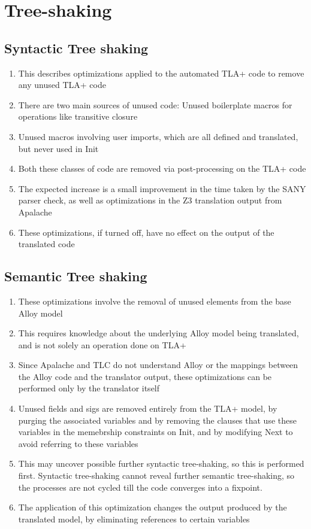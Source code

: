 

\section{Tree-shaking}


\subsection{Syntactic Tree shaking}

\begin{enumerate}
	\item This describes optimizations applied to the automated TLA+ code to remove any unused TLA+ code
	\item There are two main sources of unused code: Unused boilerplate macros for operations like transitive closure
	\item Unused macros involving user imports, which are all defined and translated, but never used in Init
	\item Both these classes of code are removed via post-processing on the TLA+ code
	\item The expected increase is a small improvement in the time taken by the SANY parser check, as well as optimizations in the Z3 translation output from Apalache
	\item These optimizations, if turned off, have no effect on the output of the translated code
\end{enumerate}

\subsection{Semantic Tree shaking}

\begin{enumerate}
	\item These optimizations involve the removal of unused elements from the base Alloy model
	\item This requires knowledge about the underlying Alloy model being translated, and is not solely an operation done on TLA+
	\item Since Apalache and TLC do not understand Alloy or the mappings between the Alloy code and the translator output, these optimizations can be performed only by the translator itself
	\item Unused fields and sigs are removed entirely from the TLA+ model, by purging the associated variables and by removing the clauses that use these variables in the memebrship constraints on Init, and by modifying Next to avoid referring to these variables
	\item This may uncover possible further syntactic tree-shaking, so this is performed first. Syntactic tree-shaking cannot reveal further semantic tree-shaking, so the processes are not cycled till the code converges into a fixpoint.
	\item The application of this optimization changes the output produced by the translated model, by eliminating references to certain variables
\end{enumerate}

